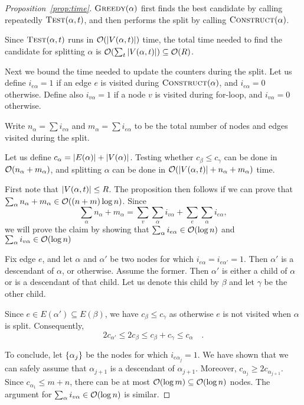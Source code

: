 \begin{proof}[Proposition~\ref{prop:time}]
$\textsc{Greedy}(\alpha)$ first finds the best candidate by calling
repeatedly $\textsc{Test}(\alpha, t)$,
and then performs the split by calling $\textsc{Construct}(\alpha)$.

Since $\textsc{Test}(\alpha, t)$ runs in $\bigO{\abs{V(\alpha, t)}}$ time,
the total time needed to find the candidate for splitting $\alpha$
is $\bigO{\sum_t \abs{V(\alpha, t)}} \subseteq \bigO{R}$.

Next we bound the time needed to update the counters during the split.
Let us define $i_{e\alpha} = 1$ if an edge $e$ is visited during $\textsc{Construct}(\alpha)$,
and $i_{e\alpha} = 0$ otherwise.
Define also $i_{v\alpha} = 1$ if a node $v$ is visited during for-loop,
and $i_{v\alpha} = 0$ otherwise.

Write $n_\alpha = \sum i_{v\alpha}$ and $m_\alpha = \sum i_{e\alpha}$ to be the total number of nodes and edges visited during the split.

Let us define $c_\alpha = {\left|E(\alpha)\right|} + {\left|V(\alpha)\right|}$.
Testing whether $c_\beta \leq c_\gamma$ can be done in $\bigO{n_\alpha + m_\alpha}$, and
splitting $\alpha$ can be done in $\bigO{\abs{V(\alpha, t)} + n_\alpha + m_\alpha}$ time.

First note that ${\left|V(\alpha, t)\right|} \leq R$.
The proposition then follows if we can prove that $\sum_\alpha n_\alpha + m_\alpha \in \bigO{(n + m) \log n}$.
Since 
\[
	\sum_\alpha n_\alpha + m_\alpha = \sum_v \sum_{\alpha} i_{v\alpha} + \sum_e \sum_{\alpha} i_{e\alpha},
\]
we will prove the claim by showing that $\sum_{\alpha} i_{e\alpha} \in \bigO{\log n}$
and  $\sum_{\alpha} i_{v\alpha} \in \bigO{\log n}$

Fix edge $e$, and let $\alpha$ and $\alpha'$ be two nodes for which $i_{e\alpha}
= i_{e\alpha'} = 1$. Then $\alpha'$ is a descendant of $\alpha$, or otherwise.
Assume the former. Then $\alpha'$ is either a child of $\alpha$ or
is a descendant of that child. Let us denote this child by $\beta$ and let $\gamma$
be the other child.

Since $e \in E(\alpha') \subseteq E(\beta)$, we have
$c_\beta \leq c_\gamma$ as otherwise $e$ is not visited
when $\alpha$ is split.
Consequently,
\[
	2 c_{\alpha'} \leq 2 c_{\beta} \leq c_\beta + c_\gamma \leq c_\alpha \quad.
\]

To conclude, let $\left\{\alpha_j\right\}$ be the nodes for which $i_{e\alpha_j} = 1$. We have shown that we can
safely assume that $\alpha_{j + 1}$ is a descendant of $\alpha_{j + 1}$. Moreover,
$c_{\alpha_j} \geq 2c_{\alpha_{j + 1}}$. Since $c_{\alpha_1} \leq m + n$,
there can be at most $\bigO{\log m} \subseteq \bigO{\log n}$ nodes.
The argument for $\sum_{\alpha} i_{v\alpha} \in \bigO{\log n}$ is similar.
\end{proof}

